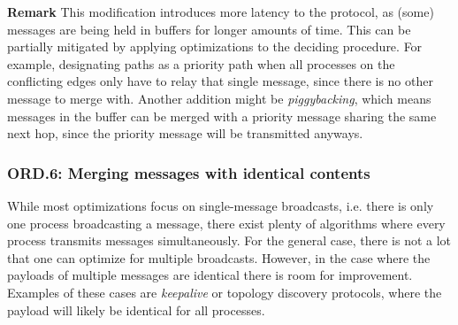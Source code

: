 \textbf{Remark}
This modification introduces more latency to the protocol, 
as (some) messages are being held in buffers for longer amounts of time. This can be partially mitigated by applying optimizations to the deciding procedure. For example, designating paths as a priority path when all processes on the conflicting edges only have to relay that single message, since there is no other message to merge with. Another addition might be \textit{piggybacking}, which means messages in the buffer can be merged with a priority message sharing the same next hop, since the priority message will be transmitted anyways.






\subsubsection{ORD.6: Merging messages with identical contents}
While most optimizations focus on single-message broadcasts, i.e. there is only one process broadcasting a message, there exist plenty of algorithms where every process transmits messages simultaneously. For the general case, there is not a lot that one can optimize for multiple broadcasts. However, in the case where the payloads of multiple messages are identical there is room for improvement. Examples of these cases are \textit{keepalive} or topology discovery protocols, where the payload will likely be identical for all processes. 

